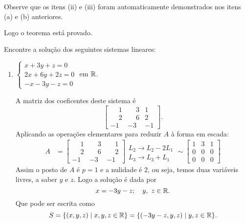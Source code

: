 \begin{prova}
	Observe que os itens (ii) e (iii) foram automaticamente demonstrados nos itens (a) e (b) anteriores.

	Logo o teorema est\'a provado.
\end{prova}

\begin{exemplo}
	Encontre a solu\c{c}\~ao dos seguintes sistemas lineares:
	\begin{enumerate}[label={\arabic*})]
		\item $\begin{cases}
		x + 3y + z = 0\\
		2x + 6y + 2z = 0\\
		-x - 3y - z = 0
		\end{cases}$ em $\mathbb{R}$.
		\begin{solucao}
		A matriz dos coeficentes deste sistema \'e
		\[
			\begin{bmatrix}
				\phantom{-}1 & \phantom{-}3 & 1\\
				\phantom{-}2 & \phantom{-}6 & 2\\
				-1 & -3 & -1
			\end{bmatrix}.
		\]
		Aplicando as opera\c{c}\~oes elementares para reduzir $A$ \`a forma em escada:
		\begin{align*}
			A &= 
				\left[
					\begin{array}{ccc}
						\phantom{-}1 & \phantom{-}3 & \phantom{-}1 \\
						\phantom{-}2 & \phantom{-}6 & \phantom{-}2 \\
						-1 & -3 & -1 
					\end{array}
				\right]
				\begin{array}{l}
					\\
					L_2 \to L_2 - 2L_1\\
					L_3 \to L_3 + L_1
				\end{array} \sim
				\left[
				\begin{array}{ccc}
					1 & 3 & 1 \\
					0 & 0 & 0 \\
					0 & 0 & 0 
				\end{array}
				\right]
		\end{align*}
		Assim o posto de $A$ \'e $p = 1$ e a nulidade \'e 2, ou seja, temos duas vari\'aveis livres, a saber $y$ e $z$. Logo a solu\c{c}\~ao \'e dada por
		\[
			x = -3y - z;\quad y,\ z \in \mathbb{R}.
		\]
		Que pode ser escrita como
		\[
			S = \{(x, y ,z) \mid x, y, z \in \mathbb{R} \} = \{(-3y - z, y, z) \mid y, z \in \mathbb{R}\}.
		\]
		\end{solucao}

\end{enumerate}
\end{exemplo}
